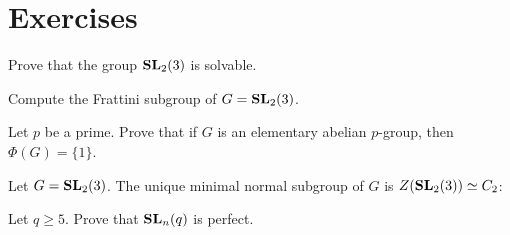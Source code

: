 



\section*{Exercises}
\begin{prob}
	Prove that the group $\mathbf{SL}_2(3)$ is solvable. 
\end{prob}

\begin{prob}
	Compute the Frattini subgroup of $G=\mathbf{SL}_2(3)$.  
\end{prob}

\begin{prob}
	Let $p$ be a prime.  Prove that if $G$ is an elementary abelian $p$-group, then 
	$\Phi(G)=\{1\}$.
\end{prob}

\begin{prob}
	Let $G=\mathbf{SL}_2(3)$. The unique minimal normal subgroup of $G$ is
	$Z(\mathbf{SL}_2(3))\simeq C_2$:
\end{prob}



\begin{prob}
Let $q\geq5$. 
Prove that $\mathbf{SL}_n(q)$ is perfect.  	
\end{prob}


